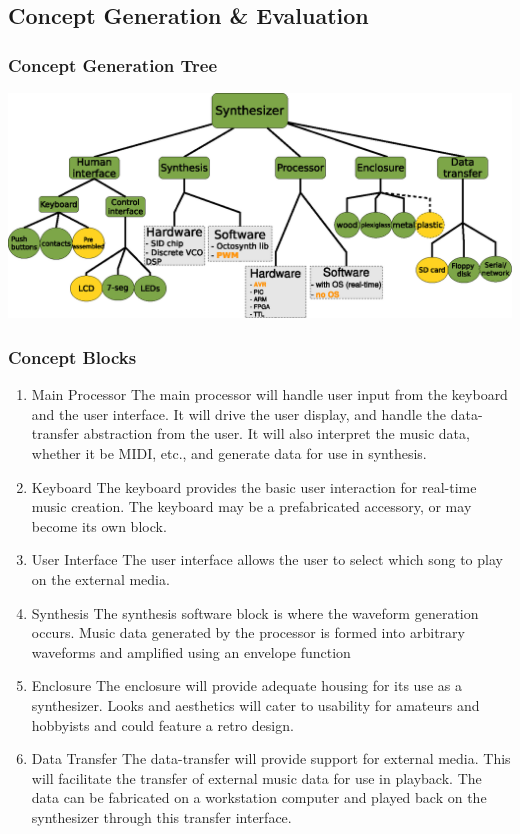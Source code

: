 \documentclass[bibtotocnumbered,abstract=on,paper=a4,fontsize=12pt,parskip=on,halfparskip=on]{scrartcl}		%
\begin{document}
  \subsection{Concept Generation \& Evaluation}  
    \subsubsection{Concept Generation Tree}
      \includegraphics[width=\linewidth]{img/fig_concepttree}
    \subsubsection{Concept Blocks}
    \begin{enumerate}
        \item{Main Processor}
          The main processor will handle user input from the keyboard and the user interface. It will drive the user display, and handle the data-transfer abstraction from the user. It will also interpret the music data, whether it be MIDI, etc., and generate data for use in synthesis.
        \item{Keyboard}
          The keyboard provides the basic user interaction for real-time music creation. The keyboard may be a prefabricated accessory, or may become its own block.
        \item{User Interface}
          The user interface allows the user to select which song to play on the external media.
        \item{Synthesis}
          The synthesis software block is where the waveform generation occurs. Music data generated by the processor is formed into arbitrary waveforms and amplified using an envelope function\
        \item{Enclosure}
          The enclosure will provide adequate housing for its use as a synthesizer. Looks and aesthetics will cater to usability for amateurs and hobbyists and could feature a retro design.
        \item{Data Transfer}
          The data-transfer will provide support for external media. This will facilitate the transfer of external music data for use in playback. The data can be fabricated on a workstation computer and played back on the synthesizer through this transfer interface.
      \end{enumerate}
\end{document}
